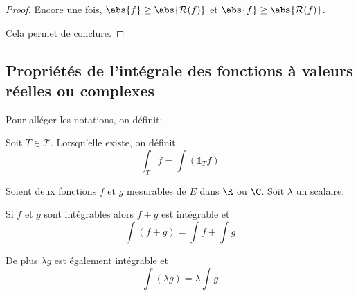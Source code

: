 \begin{proof}
Encore une fois, $\abs{f} \geq \abs{\mathcal{R}(f)}$ et $\abs{f} \geq \abs{\mathcal{R}(f)}$.

Cela permet de conclure.
\end{proof}

\subsection{Propriétés de l'intégrale des fonctions à valeurs réelles ou complexes}


Pour alléger les notations, on définit:
\begin{de}
Soit $T \in \mathcal{T}$. Lorsqu'elle existe, on définit 
\[
\displaystyle{\int_T} f = \displaystyle{\int} \left(\mathbb{1}_T f\right)
\]
\end{de}



\begin{prop}[Linéarité]
Soient deux fonctions $f$ et $g$ mesurables de $E$ dans $\R$ ou $\C$. Soit $\lambda$ un scalaire.

Si $f$ et $g$ sont intégrables alors $f+g$ est intégrable et 
\[
\displaystyle{\int} \left(f+g\right) = \displaystyle{\int} f + \displaystyle{\int} g
\]

De plus $\lambda g$ est également intégrable et 
\[
\displaystyle{\int} \left(\lambda g\right)  = \lambda \displaystyle{\int} g
\]
\end{prop}

